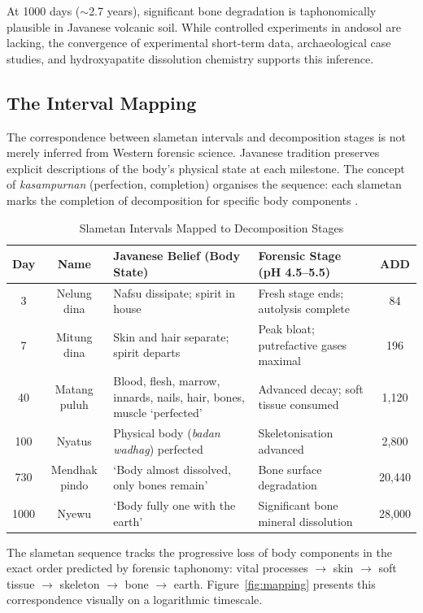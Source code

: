 \documentclass[12pt,a4paper]{article}
\begin{document}
At 1000 days ($\sim$2.7 years), significant bone degradation is taphonomically plausible in Javanese volcanic soil. While controlled experiments in andosol are lacking, the convergence of experimental short-term data, archaeological case studies, and hydroxyapatite dissolution chemistry supports this inference.

\subsection{The Interval Mapping}

The correspondence between slametan intervals and decomposition stages is not merely inferred from Western forensic science. Javanese tradition preserves explicit descriptions of the body's physical state at each milestone. The concept of \textit{kasampurnan} (perfection, completion) organises the sequence: each slametan marks the completion of decomposition for specific body components \citep{kalimullah_2016, soemodidjojo_1994}.

\begin{table}[H]
\centering
\caption{Slametan Intervals Mapped to Decomposition Stages}
\label{tab:mapping}
\small
\begin{tabularx}{\textwidth}{@{}ccXXc@{}}
\toprule
\textbf{Day} & \textbf{Name} & \textbf{Javanese Belief (Body State)} & \textbf{Forensic Stage (pH 4.5--5.5)} & \textbf{ADD} \\
\midrule
3 & Nelung dina & Nafsu dissipate; spirit in house & Fresh stage ends; autolysis complete & 84 \\
7 & Mitung dina & Skin and hair separate; spirit departs & Peak bloat; putrefactive gases maximal & 196 \\
40 & Matang puluh & Blood, flesh, marrow, innards, nails, hair, bones, muscle `perfected' & Advanced decay; soft tissue consumed & 1,120 \\
100 & Nyatus & Physical body (\textit{badan wadhag}) perfected & Skeletonisation advanced & 2,800 \\
730 & Mendhak pindo & `Body almost dissolved, only bones remain' & Bone surface degradation & 20,440 \\
1000 & Nyewu & `Body fully one with the earth' & Significant bone mineral dissolution & 28,000 \\
\bottomrule
\end{tabularx}
\end{table}

The slametan sequence tracks the progressive loss of body components in the exact order predicted by forensic taphonomy: vital processes $\rightarrow$ skin $\rightarrow$ soft tissue $\rightarrow$ skeleton $\rightarrow$ bone $\rightarrow$ earth. Figure~\ref{fig:mapping} presents this correspondence visually on a logarithmic timescale.
\end{document}
